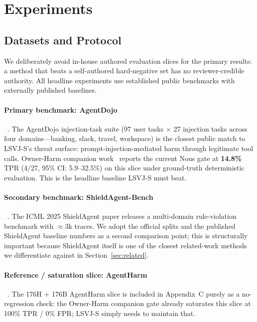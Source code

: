 \documentclass{article}
\theoremstyle{definition}
\begin{document}
\section{Experiments}
\label{sec:exp}

\subsection{Datasets and Protocol}
\label{sec:exp:data}

We deliberately avoid in-house authored evaluation slices for the
primary results: a method that beats a self-authored hard-negative
set has no reviewer-credible authority. All headline experiments
use established public benchmarks with externally published
baselines.

\paragraph{Primary benchmark: AgentDojo}~\citep{debenedetti2024agentdojo}.
The AgentDojo injection-task suite (97 user tasks $\times$ 27
injection tasks across four domains---banking, slack, travel,
workspace) is the closest public match to LSVJ-S's threat surface:
prompt-injection-mediated harm through legitimate tool calls.
Owner-Harm companion work~\citep{zhang2026ownerharm} reports the
current Nous gate at \textbf{14.8\%} TPR (4/27, 95\% CI:
5.9--32.5\%) on this slice under ground-truth deterministic
evaluation. This is the headline baseline LSVJ-S must beat.

\paragraph{Secondary benchmark: ShieldAgent-Bench}~\citep{chen2025shieldagent}.
The ICML 2025 ShieldAgent paper releases a multi-domain
rule-violation benchmark with $\approx 3$k traces. We adopt the
official splits and the published ShieldAgent baseline numbers as a
second comparison point; this is structurally important because
ShieldAgent itself is one of the closest related-work methods we
differentiate against in Section~\ref{sec:related}.

\paragraph{Reference / saturation slice: AgentHarm}~\citep{andriushchenko2025agentharm}.
The 176H + 176B AgentHarm slice is included in Appendix~C purely
as a no-regression check: the Owner-Harm companion gate already
saturates this slice at 100\% TPR / 0\% FPR; LSVJ-S simply needs
to maintain that.
\end{document}
